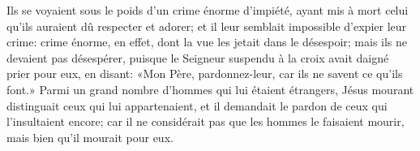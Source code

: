 Ils se voyaient sous le poids d’un crime énorme d’impiété,
	ayant mis à mort celui qu’ils auraient dû respecter et adorer;
	et il leur semblait impossible d’expier leur crime:
	crime énorme, en effet, dont la vue les jetait dans le désespoir;
	mais ils ne devaient pas désespérer,
	puisque le Seigneur suspendu à la croix avait daigné prier pour eux,
	en disant: «Mon Père, pardonnez-leur, car ils ne savent ce qu’ils font.»
Parmi un grand nombre d’hommes qui lui étaient étrangers,
	Jésus mourant distinguait ceux qui lui appartenaient,
	et il demandait le pardon de ceux qui l’insultaient encore;
	car il ne considérait pas que les hommes le faisaient mourir,
	mais bien qu’il mourait pour eux.
